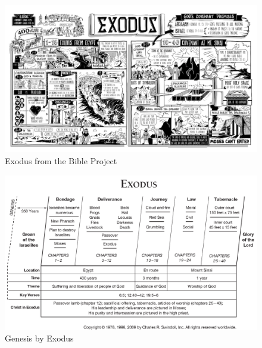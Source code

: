 
\newpage
\begin{figure}
\begin{center}
\includegraphics[scale=0.5, angle=90]{02OT-Exodus/References/BibleProject-Exodus.png}
\caption[Exodus from the Bible Project]{Exodus from the Bible Project}
\label{fig:Exodus from the Bible Project}
\end{center}
\end{figure}

\newpage
\begin{figure}
\begin{center}
\includegraphics[scale=0.3, angle=90]{02OT-Exodus/References/Swindoll-Exodus.png}
\caption[Exodus by Swindoll]{Genesis by Exodus}
\label{fig:Exodus by Swindoll}
\end{center}
\end{figure}


